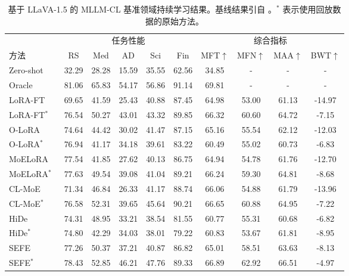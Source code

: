 \begin{table}[!htbp]
\centering
\setlength{\tabcolsep}{5pt}
\caption{基于 LLaVA-1.5 的 MLLM-CL 基准领域持续学习结果。基线结果引自 \citep{zhao2025mllm}。$^{*}$ 表示使用回放数据的原始方法。}
\renewcommand{\arraystretch}{1.1}
\begin{tabular}{lccccccccc}
\toprule
& \multicolumn{5}{c}{任务性能} & \multicolumn{4}{c}{综合指标} \\
\cmidrule(lr){2-6} \cmidrule(lr){7-10}
方法 & RS    & Med   & AD    & Sci   & Fin   & MFT$\uparrow$ & MFN$\uparrow$ & MAA$\uparrow$ & BWT$\uparrow$ \\
\midrule
Zero-shot                                     & 32.29 & 28.28 & 15.59 & 35.55 & 62.56 & 34.85 & -     & -     & -      \\
Oracle                                       & 81.06 & 65.83 & 54.17 & 56.86 & 91.14 & 69.81 & -     & -     & -      \\
\midrule
LoRA-FT~\citep{hu2021lora} & 69.65 & 41.59 & 25.43 & 40.88 & 87.45 & 64.98 & 53.00 & 61.13 & -14.97 \\
LoRA-FT$^*$~\citep{hu2021lora} & 76.54 & 50.27 & 43.01 & 43.32 & 89.85 & 66.32 & 60.60 & 64.72 & -7.15 \\
O-LoRA~\citep{wang2023orthogonal} & 74.64 & 44.42 & 30.02 & 41.47 & 87.15 & 65.16 & 55.54 & 62.12 & -12.03 \\
O-LoRA$^*$~\citep{wang2023orthogonal} & 76.94 & 41.17 & 34.18 & 39.61 & 83.22 & 60.49 & 55.02 & 60.73 & -6.83 \\
MoELoRA~\citep{chen2024coin} & 77.54 & 41.85 & 27.62 & 40.13 & 86.75 & 64.94 & 54.78 & 61.76 & -12.70 \\
MoELoRA$^*$~\citep{chen2024coin} & 77.63 & 49.54 & 39.08 & 41.04 & 89.21 & 66.24 & 59.30 & 64.81 & -8.68 \\
CL-MoE~\citep{huai2025cl} & 71.34 & 46.84 & 26.33 & 41.17 & 88.74 & 66.06 & 54.88 & 61.79 & -13.96 \\
CL-MoE$^*$~\citep{huai2025cl} & 76.58 & 52.31 & 39.65 & 45.64 & 90.21 & 66.65 & 60.88 & 64.95 & -7.22 \\
HiDe~\citep{guo2025hide} & 74.31 & 48.95 & 33.21 & 38.54 & 81.55 & 60.77 & 55.31 & 60.68 & -6.82 \\
HiDe$^*$~\citep{guo2025hide} & 74.80 & 42.29 & 34.03 & 38.01 & 79.22 & 60.83 & 53.67 & 61.81 & -8.95 \\
SEFE~\citep{chen2025sefe} & 77.26 & 50.37 & 37.21 & 40.87 & 86.82 & 65.01 & 58.51 & 63.63 & -8.13 \\
SEFE$^*$~\citep{chen2025sefe} & 78.43 & 52.85 & 46.21 & 47.76 & 89.33 & 66.89 & 62.92 & 66.51 & -4.97 \\

\end{tabular}
\end{table}
